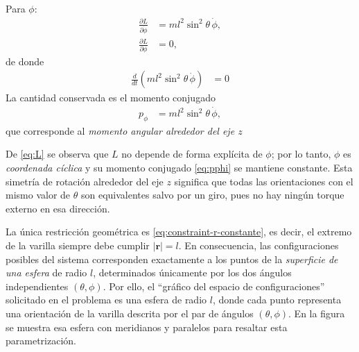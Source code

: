 \documentclass{article}
\begin{document}
Para $\phi$:
\begin{equation}
\begin{split}
\frac{\partial L}{\partial \dot\phi} &= m l^{2}\sin^{2}\theta\,\dot\phi,\\
\frac{\partial L}{\partial \phi} &= 0,
\end{split}\label{eq:parciales-phi}
\end{equation}
de donde
\begin{equation}
\begin{split}
\frac{d}{dt}\!\left(m l^{2}\sin^{2}\theta\,\dot\phi\right) &= 0 
\end{split}\label{eq:ecuacion-phi}
\end{equation}
La cantidad conservada es el momento conjugado
\begin{equation}
\begin{split}
p_\phi &= m l^{2}\sin^{2}\theta\,\dot\phi ,
\end{split}\label{eq:pphi}
\end{equation}
que corresponde al \emph{momento angular alrededor del eje $z$}

De \eqref{eq:L} se observa que $L$ no depende de forma explícita de $\phi$; por lo tanto, $\phi$ es
\emph{coordenada cíclica} y su momento conjugado \eqref{eq:pphi} se mantiene constante.
Esta simetría de rotación alrededor del eje $z$ significa que todas las
orientaciones con el mismo valor de $\theta$ son equivalentes salvo por un giro,
pues no hay ningún torque externo en esa dirección.

La única restricción geométrica es \eqref{eq:constraint-r-constante}, es decir,
el extremo de la varilla siempre debe cumplir $|\mathbf r| = l$.
En consecuencia, las configuraciones posibles del sistema corresponden
exactamente a los puntos de la \emph{superficie de una esfera} de radio $l$,
determinados únicamente por los dos ángulos independientes $(\theta,\phi)$.
Por ello, el “gráfico del espacio de configuraciones” solicitado en el problema
es una esfera de radio $l$, donde cada punto representa una orientación de la
varilla descrita por el par de ángulos $(\theta,\phi)$. En la figura se muestra
esa esfera con meridianos y paralelos para resaltar esta parametrización.


\vspace{0.5cm}
\begin{center}
\end{center}  \vspace{0.5cm}
\end{document}
